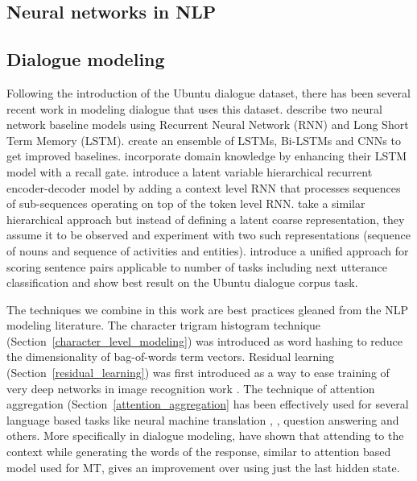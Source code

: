 \documentclass[11pt]{article}
\begin{document}
\subsection{Neural networks in NLP}

\subsection{Dialogue modeling}

Following the introduction of the Ubuntu dialogue dataset, there has been several recent work in modeling dialogue that uses this dataset. \cite{DBLP:conf/sigdial/LowePSP15} describe two neural network baseline models using Recurrent Neural Network (RNN) and Long Short Term Memory (LSTM). 
\cite{DBLP:journals/corr/KadlecSK15} create an ensemble of LSTMs, Bi-LSTMs and CNNs to get improved baselines. 
\cite{xu2016incorporating} incorporate domain knowledge by enhancing their LSTM model with a recall gate.
\cite{serban2016hierarchical} introduce a latent variable hierarchical recurrent encoder-decoder model by adding a context level RNN that processes sequences of sub-sequences operating on top of the token level RNN.
\cite{serban2016multiresolution} take a similar hierarchical approach but instead of defining a latent coarse representation, they assume it to be observed and experiment with two such representations (sequence of nouns and sequence of activities and entities).
\cite{baudivs2016sentence} introduce a unified approach for scoring sentence pairs applicable to number of tasks including next utterance classification and show best result on the Ubuntu dialogue corpus task. 

The techniques we combine in this work are best practices gleaned from the NLP modeling literature. 
The character trigram histogram technique (Section~\ref{character_level_modeling}) was introduced as word hashing \cite{DBLP:conf/cikm/HuangHGDAH13} to reduce the dimensionality of bag-of-words term vectors. Residual learning (Section~\ref{residual_learning}) was first introduced as a way to ease training of very deep networks in image recognition work \cite{he2015deep}. The technique of attention aggregation (Section~\ref{attention_aggregation} has been effectively used for several language based tasks like neural machine translation \cite{DBLP:journals/corr/BahdanauCB14}, \cite{DBLP:conf/emnlp/LuongPM15}, question answering \cite{} and others. More specifically in dialogue modeling, \cite{DBLP:journals/corr/YaoPZW16} have shown that attending to the context while generating the words of the response, similar to attention based model used for MT, gives an improvement over using just the last hidden state.
\end{document}
